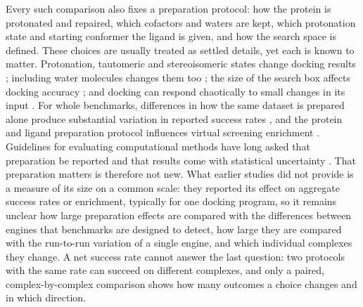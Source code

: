 Every such comparison also fixes a preparation protocol: how the protein is protonated and
repaired, which cofactors and waters are kept, which protonation state and starting
conformer the ligand is given, and how the search space is defined. These choices are
usually treated as settled details, yet each is known to matter. Protonation, tautomeric and
stereoisomeric states change docking results \citep{tenbrink2009protonation}; including
water molecules changes them too \citep{roberts2008water}; the size of the search box
affects docking accuracy \citep{feinstein2015boxsize}; and docking can respond chaotically
to small changes in its input \citep{feher2012chaotic}. For whole benchmarks, differences
in how the same dataset is prepared alone produce substantial variation in reported success
rates \citep{corbeil2012variability}, and the protein and ligand preparation protocol
influences virtual screening enrichment \citep{sastry2013preparation}. Guidelines for
evaluating computational methods have long asked that preparation be reported and that
results come with statistical uncertainty \citep{jain2008recommendations}. That preparation matters is therefore not new. What earlier studies did not provide is a
measure of its size on a common scale: they reported its effect on aggregate success rates or
enrichment, typically for one docking program, so it remains unclear how large preparation
effects are compared with the differences between engines that benchmarks are designed to
detect, how large they are compared with the run-to-run variation of a single engine, and
which individual complexes they change. A net success rate cannot answer the last question:
two protocols with the same rate can succeed on different complexes, and only a paired,
complex-by-complex comparison shows how many outcomes a choice changes and in which
direction.

